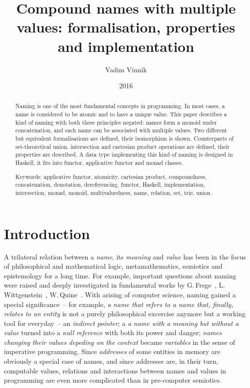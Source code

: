 \documentclass{article}
\title{Compound names with multiple values: formalisation, properties and implementation}
\author{Vadim Vinnik}
\date{2016}
\theoremstyle{definition}
\begin{document}
\maketitle

\begin{abstract}
Naming is one of the most fundamental concepts in programming.  In most cases,
a name is considered to be atomic and to have a unique value.  This paper
describes a kind of naming with both these principles negated: names form a
monoid under concatenation, and each name can be associated with multiple
values.  Two different but equivalent formalisations are defined, their
isomorphism is shown.  Counterparts of set-theoretical union, intersection and
cartesian product operations are defined, their properties are described.  A
data type implementing this kind of naming is designed in Haskell, it fits into
functor, applicative functor and monad classes.

Keywords:
applicative functor,
atomicity,
cartesian product,
compoundness,
concatenation,
denotation,
dereferencing,
functor,
Haskell,
implementation,
intersection,
monad,
monoid,
multivaluedness,
name,
relation,
set,
trie,
union.
\end{abstract}



\tableofcontents



\section{Introduction}

A trilateral relation between a \emph{name}, its \emph{meaning} and
\emph{value} has been in the focus of philosophical and mathematical logic,
metamathematics, semiotics and epistemology for a long time.  For example,
important questions about naming were raised and deeply investigated in
fundamental works by G.\,Frege~\cite{bib:frege},
L.\,Wittgenstein~\cite{bib:wittgenstein}, W.\,Quine~\cite{bib:quine}.  With
arising of computer science, naming gained a special significance~-- for
example, \emph{a name that refers to a name that, finally, relates to an
entity} is not a purely philosophical excercise anymore but a working tool for
everyday~-- an \emph{indirect pointer}; a \emph{a name with a meaning but
without a value} turned into a \emph{null reference} with both its power and
danger; \emph{names changing their values depeding on the context} became
\emph{variables} in the sense of imperative programming. Since \emph{addresses}
of some entities in memory are obviously a special case of names, and since
addresses are, in their turn, computable values, relations and interactions
between names and values in programming are even more complicated than in
pre-computer semiotics.
\end{document}
